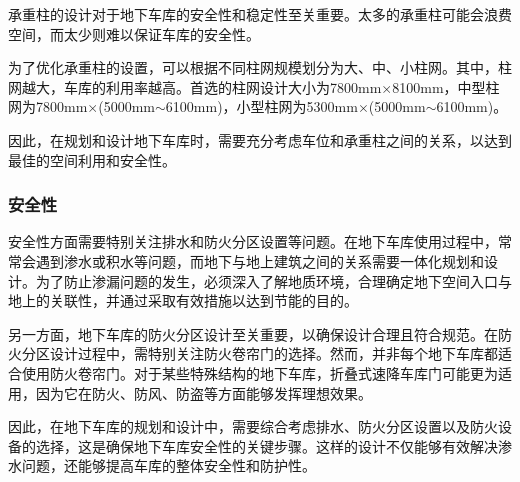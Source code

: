 承重柱的设计对于地下车库的安全性和稳定性至关重要。太多的承重柱可能会浪费空间，而太少则难以保证车库的安全性。

为了优化承重柱的设置，可以根据不同柱网规模划分为大、中、小柱网。其中，柱网越大，车库的利用率越高。首选的柱网设计大小为7800mm$\times$8100mm，中型柱网为7800mm$\times$(5000mm$\sim$6100mm)，小型柱网为5300mm$\times$(5000mm$\sim$6100mm)\cite{SCSA202308036}。

因此，在规划和设计地下车库时，需要充分考虑车位和承重柱之间的关系，以达到最佳的空间利用和安全性。
\subsubsection{安全性}
安全性方面需要特别关注排水和防火分区设置等问题。在地下车库使用过程中，常常会遇到渗水或积水等问题，而地下与地上建筑之间的关系需要一体化规划和设计。为了防止渗漏问题的发生，必须深入了解地质环境，合理确定地下空间入口与地上的关联性，并通过采取有效措施以达到节能的目的。\cite{YNJC202308018}

另一方面，地下车库的防火分区设计至关重要，以确保设计合理且符合规范。在防火分区设计过程中，需特别关注防火卷帘门的选择。然而，并非每个地下车库都适合使用防火卷帘门。对于某些特殊结构的地下车库，折叠式速降车库门可能更为适用，因为它在防火、防风、防盗等方面能够发挥理想效果。\cite{GXKE202312020}

因此，在地下车库的规划和设计中，需要综合考虑排水、防火分区设置以及防火设备的选择，这是确保地下车库安全性的关键步骤。这样的设计不仅能够有效解决渗水问题，还能够提高车库的整体安全性和防护性。
